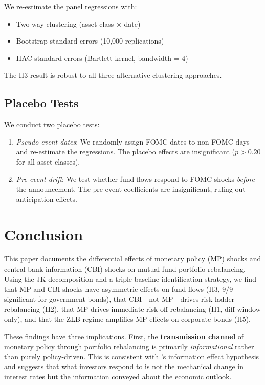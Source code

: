 \documentclass[11pt,a4paper]{article}
\begin{document}
We re-estimate the panel regressions with:
\begin{itemize}[noitemsep]
    \item Two-way clustering (asset class $\times$ date)
    \item Bootstrap standard errors (10,000 replications)
    \item HAC standard errors (Bartlett kernel, bandwidth = 4)
\end{itemize}

The H3 result is robust to all three alternative clustering approaches.

\subsection{Placebo Tests}

We conduct two placebo tests:
\begin{enumerate}
    \item \textit{Pseudo-event dates}: We randomly assign FOMC dates to non-FOMC days and re-estimate the regressions. The placebo effects are insignificant ($p > 0.20$ for all asset classes).
    \item \textit{Pre-event drift}: We test whether fund flows respond to FOMC shocks \textit{before} the announcement. The pre-event coefficients are insignificant, ruling out anticipation effects.
\end{enumerate}

\section{Conclusion}
\label{sec:conclude}

This paper documents the differential effects of monetary policy (MP) shocks and central bank information (CBI) shocks on mutual fund portfolio rebalancing. Using the JK decomposition and a triple-baseline identification strategy, we find that MP and CBI shocks have asymmetric effects on fund flows (H3, 9/9 significant for government bonds), that CBI---not MP---drives risk-ladder rebalancing (H2), that MP drives immediate risk-off rebalancing (H1, diff window only), and that the ZLB regime amplifies MP effects on corporate bonds (H5).

These findings have three implications. First, the \textbf{transmission channel} of monetary policy through portfolio rebalancing is primarily \textit{informational} rather than purely policy-driven. This is consistent with \citet{nakamura2018high}'s information effect hypothesis and suggests that what investors respond to is not the mechanical change in interest rates but the information conveyed about the economic outlook.
\end{document}
